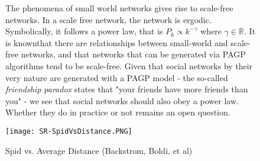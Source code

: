     \begin{figure}[H]
        \begin{minipage}{.5\textwidth}
        The phenomena of small world networks gives rise to scale-free networks. In a scale free network, the network is ergodic. Symbolically, it follows a power law, that is $P_k\propto k^{-\gamma}$ where $\gamma\in\mathbb{R}$. It is known\footnotemark[3] that there are relationships between small-world and scale-free networks, and that networks that can be generated via PAGP algorithms tend to be scale-free\footnotemark[4]. Given that social networks by their very nature are generated with a PAGP model - the so-called \textit{friendship paradox} states that "your friends have more friends than you" - we see that social networks should also obey a power law. Whether they do in practice or not remains an open question.
        \end{minipage}%
        \begin{minipage}{.5\textwidth}\centering
            \texttt{[image: SR-SpidVsDistance.PNG]}
            \caption{Spid vs. Average Distance (Backstrom, Boldi, et al)}
            \label{fig:avdistspid}
        \end{minipage}
    \end{figure}
    
